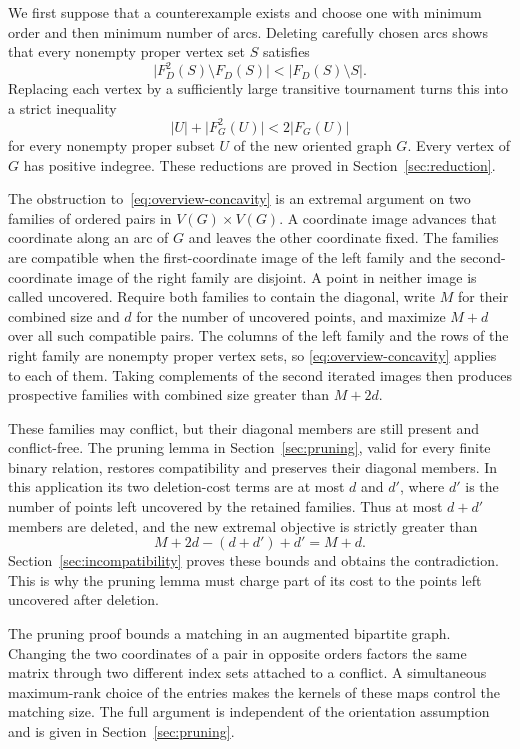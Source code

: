 \documentclass[11pt]{article}
\theoremstyle{remark}
\newcommand{\abs}[1]{\lvert #1\rvert}
\begin{document}
We first suppose that a counterexample exists and choose one with minimum
order and then minimum number of arcs.  Deleting carefully chosen arcs
shows that every nonempty proper vertex set \(S\) satisfies
\[
 \abs{F_D^2(S)\setminus F_D(S)}
 <
 \abs{F_D(S)\setminus S}.
\]
Replacing each vertex by a sufficiently large transitive tournament turns
this into a strict inequality
\begin{equation}\label{eq:overview-concavity}
 \abs{U}+\abs{F_G^2(U)}<2\abs{F_G(U)}
\end{equation}
for every nonempty proper subset \(U\) of the new oriented graph \(G\).
Every vertex of \(G\) has positive indegree.  These reductions are proved in
Section~\ref{sec:reduction}.

The obstruction to~\eqref{eq:overview-concavity} is an extremal argument
on two families of ordered pairs in $V(G)\times V(G)$.  A coordinate image
advances that coordinate along an arc of $G$ and leaves the other coordinate
fixed.  The families are compatible when the first-coordinate image of the left family and the
second-coordinate image of the right family are disjoint.  A point in
neither image is called uncovered.  Require both families to contain the
diagonal, write $M$ for their combined size and $d$ for the number of
uncovered points, and maximize $M+d$ over all such compatible pairs.
The columns of the left family and the rows of the right family are
nonempty proper vertex sets, so
\eqref{eq:overview-concavity} applies to each of them.  Taking complements
of the second iterated images then produces prospective families with
combined size greater than $M+2d$.

These families may conflict, but their diagonal members are still present
and conflict-free.  The pruning lemma in
Section~\ref{sec:pruning}, valid for every finite binary relation,
restores compatibility and preserves their diagonal members.
In this application its two deletion-cost terms are at most $d$ and $d'$,
where $d'$ is the number of points left uncovered by the retained families.
Thus at most $d+d'$ members are deleted, and the new extremal objective is
strictly greater than
\[
 M+2d-(d+d')+d'=M+d.
\]
Section~\ref{sec:incompatibility} proves these bounds and obtains the
contradiction.  This is why the pruning lemma must charge part of its
cost to the points left uncovered after deletion.

The pruning proof bounds a matching in an augmented bipartite graph.
Changing the two coordinates of a pair in opposite orders factors the
same matrix through two different index sets attached to a conflict.
A simultaneous maximum-rank choice of the entries makes the kernels of
these maps control the matching size.  The full argument is independent
of the orientation assumption and is given in Section~\ref{sec:pruning}.
\end{document}
